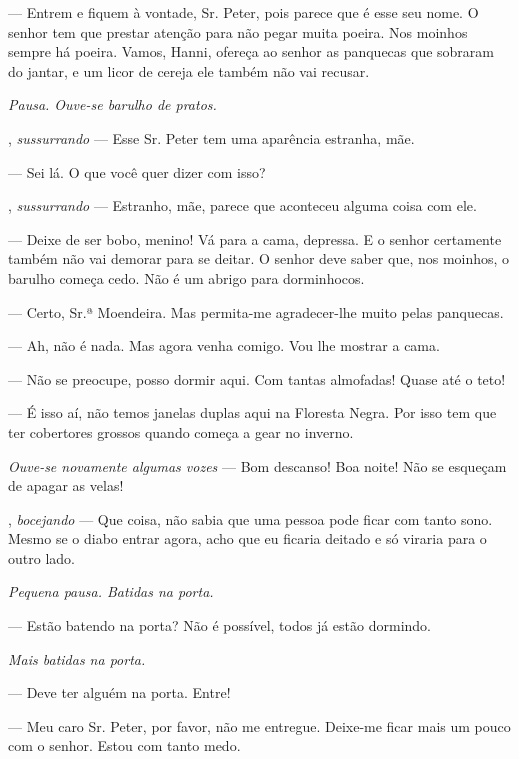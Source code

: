\begin{myparindent}{0pt}
\begin{Parskip}
 --- Entrem e fiquem à vontade, Sr. Peter, pois parece que é
esse seu nome. O senhor tem que prestar atenção para não pegar muita
poeira. Nos moinhos sempre há poeira. Vamos, Hanni, ofereça ao senhor as
panquecas que sobraram do jantar, e um licor de cereja ele também não
vai recusar.

\emph{Pausa. Ouve-se barulho de pratos.}

, \emph{sussurrando} --- Esse Sr. Peter tem uma
aparência estranha, mãe.

 --- Sei lá. O que você quer dizer com isso?

, \emph{sussurrando} --- Estranho, mãe, parece que
aconteceu alguma coisa com ele.

 --- Deixe de ser bobo, menino! Vá para a cama, depressa. E o
senhor certamente também não vai demorar para se deitar. O senhor deve
saber que, nos moinhos, o barulho começa cedo. Não é um abrigo para
dorminhocos.

 --- Certo, Sr.ª Moendeira. Mas permita-me
agradecer-lhe muito pelas panquecas.

 --- Ah, não é nada. Mas agora venha comigo. Vou lhe mostrar a
cama.

 --- Não se preocupe, posso dormir aqui. Com tantas
almofadas! Quase até o teto!

 --- É isso aí, não temos janelas duplas aqui na Floresta Negra.
Por isso tem que ter cobertores grossos quando começa a gear no inverno.

\emph{Ouve-se novamente algumas vozes} --- Bom descanso! Boa noite! Não
se esqueçam de apagar as velas!

, \emph{bocejando} --- Que coisa, não sabia que uma
pessoa pode ficar com tanto sono. Mesmo se o diabo entrar agora, acho
que eu ficaria deitado e só viraria para o outro lado.

\emph{Pequena pausa. Batidas na porta.}

 --- Estão batendo na porta? Não é possível, todos já
estão dormindo.

\emph{Mais batidas na porta.}

 --- Deve ter alguém na porta. Entre!

 --- Meu caro Sr. Peter, por favor, não me entregue.
Deixe-me ficar mais um pouco com o senhor. Estou com tanto medo.


\end{Parskip}
\end{myparindent}
